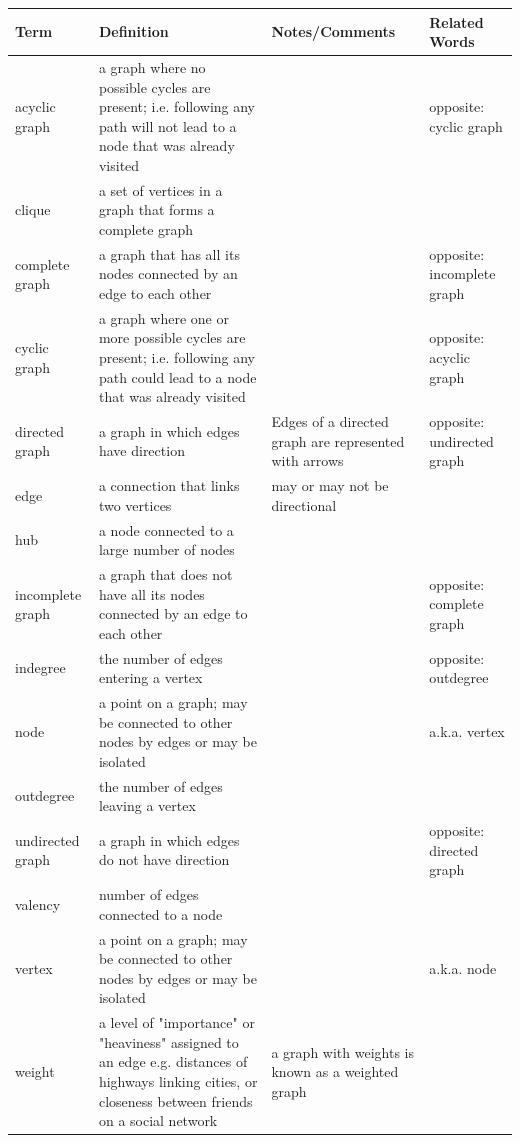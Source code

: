 \documentclass[11pt]{article}
\begin{document}
\begin{tabular}{| l | p{5cm} | p{4cm} | p{4cm} |}
\hline
Term & Definition & Notes/Comments & Related Words\\ \hline
acyclic graph & a graph where no possible cycles are present; i.e. following any path will not lead to a node that was already visited && opposite: cyclic graph \\ \hline

clique & a set of vertices in a graph that forms a complete graph && \\ \hline


complete graph & a graph that has all its nodes connected by an edge to each other && opposite: incomplete graph \\ \hline

cyclic graph & a graph where one or more possible cycles are present; i.e. following any path could lead to a node that was already visited && opposite: acyclic graph \\ \hline

directed graph & a graph in which edges have direction & Edges of a directed graph are represented with arrows & opposite: undirected graph \\ \hline

edge & a connection that links two vertices & may or may not be directional & \\ \hline

hub & a node connected to a large number of nodes && \\ \hline

incomplete graph & a graph that does not have all its nodes connected by an edge to each other && opposite: complete graph \\ \hline

indegree & the number of edges entering a vertex && opposite: outdegree \\ \hline 

node & a point on a graph; may be connected to other nodes by edges or may be isolated && a.k.a. vertex \\ \hline

outdegree & the number of edges leaving a vertex && \\ \hline

undirected graph & a graph in which edges do not have direction && opposite: directed graph \\ \hline

valency & number of edges connected to a node && \\ \hline

vertex & a point on a graph; may be connected to other nodes by edges or may be isolated && a.k.a. node \\ \hline

weight & a level of "importance" or "heaviness" assigned to an edge e.g. distances of highways linking cities, or closeness between friends on a social network & a graph with weights is known as a weighted graph & \\ \hline

\end{tabular}
\end{document}
